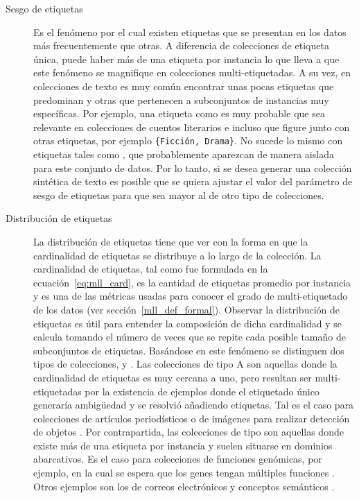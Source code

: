 \begin{description} \label{mll_fenomenos}

	\item[Sesgo de etiquetas] Es el fenómeno por el cual existen etiquetas que se
	      presentan en los datos más frecuentemente que otras. A diferencia de
	      colecciones de etiqueta única, puede haber más de una etiqueta por
	      instancia lo que lleva a que este fenómeno se magnifique en colecciones
	      multi-etiquetadas. A su vez, en colecciones de texto es muy común
	      encontrar unas pocas etiquetas que predominan y otras que pertenecen a
	      subconjuntos de instancias muy específicas. Por ejemplo, una etiqueta como
	       es muy probable que sea relevante en
	      colecciones de cuentos literarios e incluso que figure junto con otras
	      etiquetas, por ejemplo \texttt{\{Ficción, Drama\}}.  No sucede lo mismo
	      con etiquetas tales como , que probablemente
	      aparezcan de manera aislada para este conjunto de datos.  Por lo tanto, si
	      se desea generar una colección sintética de texto es posible que se quiera
	      ajustar el valor del parámetro de sesgo de etiquetas para que sea mayor al
	      de otro tipo de colecciones.

	\item[Distribución de etiquetas] La distribución de etiquetas tiene que ver
	      con la forma en que la cardinalidad de etiquetas se distribuye a lo largo
	      de la colección. La cardinalidad de etiquetas, tal como fue formulada en
	      la ecuación~\ref{eq:mll_card}, es la cantidad de etiquetas promedio por
	      instancia y es una de las métricas usadas para conocer el grado de
	      multi-etiquetado de los datos (ver sección~\ref{mll_def_formal}). Observar
	      la distribución de etiquetas es útil para entender la composición de dicha
	      cardinalidad y se calcula tomando el número de veces que se repite cada
	      posible tamaño de subconjuntos de etiquetas. Basándose en este fenómeno se
	      distinguen dos tipos de colecciones,  y . Las
	      colecciones de tipo A son aquellas donde la cardinalidad de etiquetas es
	      muy cercana a uno, pero resultan ser multi-etiquetadas por la existencia de
	      ejemplos donde el etiquetado único generaría ambigüedad y se resolvió
	      añadiendo etiquetas. Tal es el caso para colecciones de artículos
	      periodísticos \cite{lang_newsweeder_1995} o de imágenes para realizar
	      detección de objetos \cite{boutell_learning_2004}. Por contrapartida, las
	      colecciones de tipo  son aquellas donde existe más de una
	      etiqueta por instancia y suelen situarse en dominios abarcativos. Es el
	      caso para colecciones de funciones genómicas, por ejemplo, en la cual se
	      espera que los genes tengan múltiples funciones
	      \cite{diplaris_protein_2005}.  Otros ejemplos son los de correos
	      electrónicos \cite{hutchison_enron_2004} y conceptos semánticos
	      \cite{snoek_challenge_2006}.


\end{description}

